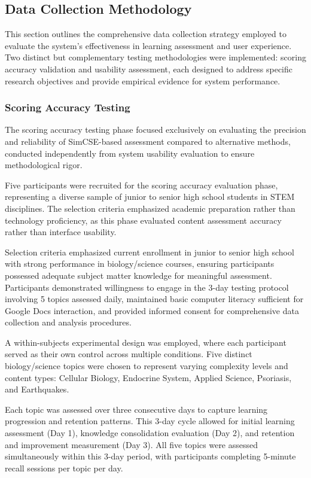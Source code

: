 {\subsection{Data Collection Methodology}

This section outlines the comprehensive data collection strategy employed to evaluate the system's effectiveness in learning assessment and user experience. Two distinct but complementary testing methodologies were implemented: scoring accuracy validation and usability assessment, each designed to address specific research objectives and provide empirical evidence for system performance.

\subsubsection{Scoring Accuracy Testing}

The scoring accuracy testing phase focused exclusively on evaluating the precision and reliability of SimCSE-based assessment compared to alternative methods, conducted independently from system usability evaluation to ensure methodological rigor.

Five participants were recruited for the scoring accuracy evaluation phase, representing a diverse sample of junior to senior high school students in STEM disciplines. The selection criteria emphasized academic preparation rather than technology proficiency, as this phase evaluated content assessment accuracy rather than interface usability.

Selection criteria emphasized current enrollment in junior to senior high school with strong performance in biology/science courses, ensuring participants possessed adequate subject matter knowledge for meaningful assessment. Participants demonstrated willingness to engage in the 3-day testing protocol involving 5 topics assessed daily, maintained basic computer literacy sufficient for Google Docs interaction, and provided informed consent for comprehensive data collection and analysis procedures.


A within-subjects experimental design was employed, where each participant served as their own control across multiple conditions. Five distinct biology/science topics were chosen to represent varying complexity levels and content types: Cellular Biology, Endocrine System, Applied Science, Psoriasis, and Earthquakes.

Each topic was assessed over three consecutive days to capture learning progression and retention patterns. This 3-day cycle allowed for initial learning assessment (Day 1), knowledge consolidation evaluation (Day 2), and retention and improvement measurement (Day 3). All five topics were assessed simultaneously within this 3-day period, with participants completing 5-minute recall sessions per topic per day.

}
